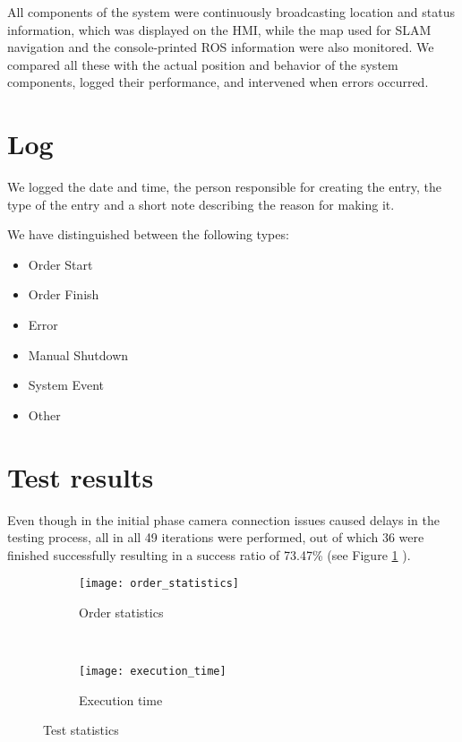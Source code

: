 All components of the system were continuously broadcasting location and status information, which was displayed on the HMI, while the map used for SLAM navigation and the console-printed ROS information were also monitored. We compared all these with the actual position and behavior of the system components, logged their performance, and intervened when errors occurred. 

\section{Log}

We logged the date and time, the person  responsible for creating the entry, the type of the entry and a short note describing the reason for making it.

We have distinguished between the following types:

\begin{itemize}
	\item Order Start
	\item Order Finish
	\item Error
	\item Manual Shutdown
	\item System Event
	\item Other
\end{itemize}


\section{Test results}

Even though in the initial phase camera connection issues caused delays in the testing process, all in all 49 iterations were performed, out of which 36 were finished successfully resulting in a success ratio of 73.47\% (see Figure \ref{fig:order_statistics} ).

\begin{figure}[H]
    \centering
    \begin{subfigure}[b]{0.48\textwidth}
        \texttt{[image: order\_statistics]}
        \caption{Order statistics}
        \label{fig:order_statistics}
    \end{subfigure}
    ~
    \begin{subfigure}[b]{0.48\textwidth}
        \texttt{[image: execution\_time]}
        \caption{Execution time}
        \label{fig:execution_time}
	\end{subfigure}
\caption{Test statistics}
\end{figure}

